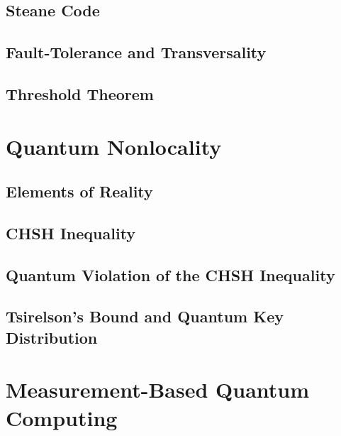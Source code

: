     \section{Steane Code} %

    \section{Fault-Tolerance and Transversality} %

    \section{Threshold Theorem} %

\chapter{Quantum Nonlocality} %

    \section{Elements of Reality} %

    \section{CHSH Inequality} %

    \section{Quantum Violation of the CHSH Inequality} %

    \section{Tsirelson's Bound and Quantum Key Distribution} %

\chapter{Measurement-Based Quantum Computing} %

